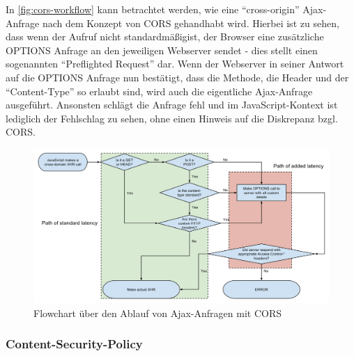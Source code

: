 In \autoref{fig:cors-workflow} kann betrachtet werden, wie eine \enquote{cross-origin} Ajax-Anfrage nach dem Konzept von CORS gehandhabt wird. Hierbei ist zu sehen, dass wenn der Aufruf nicht standardmäßig\footnotemark ist, der Browser eine zusätzliche OPTIONS Anfrage an den jeweiligen Webserver sendet - dies stellt einen sogenannten \enquote{Preflighted Request} dar. Wenn der Webserver in seiner Antwort auf die OPTIONS Anfrage nun bestätigt, dass die Methode, die Header und der \enquote{Content-Type} so erlaubt sind, wird auch die eigentliche Ajax-Anfrage ausgeführt. Ansonsten schlägt die Anfrage fehl und im JavaScript-Kontext ist lediglich der Fehlschlag zu sehen, ohne einen Hinweis auf die Diskrepanz bzgl. CORS.


\begin{figure}[H]
	\centering
	\includegraphics[width=\linewidth]{img/02_theorie/1280px-Flowchart_showing_Simple_and_Preflight_XHR.svg.png}
	\caption{Flowchart über den Ablauf von Ajax-Anfragen mit CORS \cite{FlowchartCORS}}
	\label{fig:cors-workflow}
\end{figure}

\subsubsection{Content-Security-Policy}


